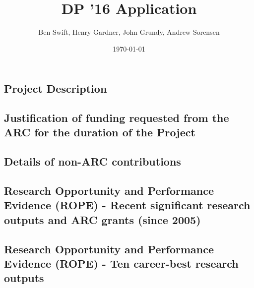 \documentclass[13pt,a4paper]{scrartcl}
\author{Ben Swift, Henry Gardner, John Grundy, Andrew Sorensen}
\date{\today}
\title{DP '16 Application}
\begin{document}
\setcounter{section}{3} %
\subsection{Project Description}
\label{sec:project-description}



\setcounter{section}{5} %
\setcounter{subsection}{0}
\subsection{Justification of funding requested from the ARC for the
  duration of the Project}
\label{sec:funding-justification}



\subsection{Details of non-ARC contributions}
\label{sec:non-arc-contributions}


\setcounter{section}{6}
\setcounter{subsection}{11} %
\subsection{Research Opportunity and Performance Evidence (ROPE) - Recent
  significant research outputs and ARC grants (since 2005)}
\label{sec:recent-significant-outputs}



\subsection{Research Opportunity and Performance Evidence (ROPE) - Ten
  career-best research outputs}
\label{sec:ten-best-outputs}
\end{document}
